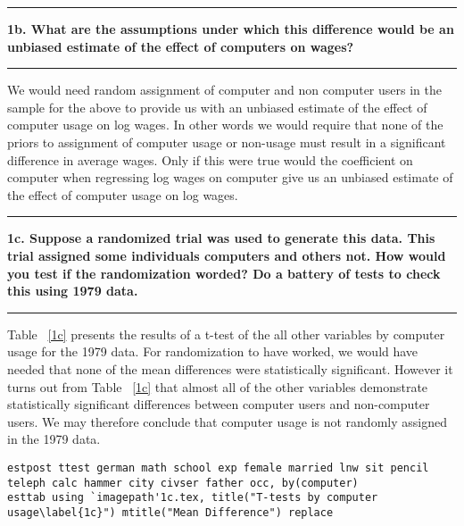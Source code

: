 \documentclass[12pt]{article}
\newcommand\question[1]{\vspace{1em}\hrule\vspace{1em}\textbf{#1}\vspace{1em}\hrule\vspace{1em}}
\begin{document}

\begin{table}
\caption{}

\end{table}

\newpage
\question{1b. What are the assumptions under which this difference would be an unbiased estimate of the effect of computers on wages?}
We would need random assignment of computer and non computer users in the sample for the above to provide us with an unbiased estimate of the effect of computer usage on log wages. In other words we would require that none of the priors to assignment of computer usage or non-usage must result in a significant difference in average wages. Only if this were true would the coefficient on computer when regressing log wages on computer give us an unbiased estimate of the effect of computer usage on log wages.

\question{1c. Suppose a randomized trial was used to generate this data. This trial assigned some individuals computers and others not. How would you test if the randomization worded? Do a battery of tests to check this using 1979 data.}
Table ~\ref{1c} presents the results of a t-test of the all other variables by computer usage for the 1979 data. For randomization to have worked, we would have needed that none of the mean differences were statistically significant. However it turns out from Table ~\ref{1c} that almost all of the other variables demonstrate statistically significant differences between computer users and non-computer users. We may therefore conclude that computer usage is not randomly assigned in the 1979 data.

\begin{lstlisting}
estpost ttest german math school exp female married lnw sit pencil teleph calc hammer city civser father occ, by(computer)
esttab using `imagepath'1c.tex, title("T-tests by computer usage\label{1c}") mtitle("Mean Difference") replace
\end{lstlisting}


\end{document}
